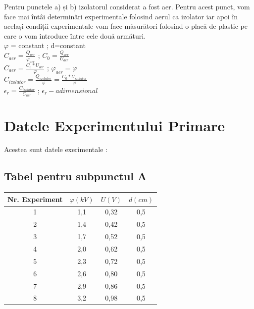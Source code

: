 \documentclass[12pt]{article}
\begin{document}
Pentru punctele a) și b) izolatorul considerat a fost aer. Pentru acest punct, vom face mai întâi determinări experimentale folosind aerul
ca izolator iar apoi în același condiții experimentale vom face măsurători folosind o placă de plastic pe care o vom introduce între cele două armături.\\

$\varphi$ = constant ; d=constant \\

$C_{aer}=\frac{Q_{aer}}{\varphi_{aer}}$  ;  $C_{0}=\frac{Q_{aer}}{U_{aer}}$\\

$C_{aer}=\frac{C_{0}*U_{aer}}{\varphi}$  ; $\varphi_{aer}=\varphi$\\

$C_{izolator}=\frac{Q_{izolator}}{\varphi}=\frac{C_{0}*U_{izolator}}{\varphi}$\\

$\epsilon_{r}=\frac{C_{izolator}}{C_{aer}}$  ;  $\epsilon_{r}-adimensional$\\



\section{Datele Experimentului Primare}
Acestea sunt datele exerimentale : 

\subsection{Tabel pentru subpunctul A}

\begin{table}[h!]
    \centering
    \begin{tabular}{|c|c|c|c|}
        \hline
        Nr. Experiment & $\varphi (kV)$ & $U (V)$  & $d (cm)$ \\
        \hline
        1 & 1,1 & 0,32 & 0,5 \\
        \hline
        2 & 1,4 & 0,42 & 0,5 \\
        \hline
        3 & 1,7 & 0,52 & 0,5 \\
        \hline
        4 & 2,0 & 0,62 & 0,5 \\
        \hline
        5 & 2,3 & 0,72 & 0,5 \\
        \hline
        6 & 2,6 & 0,80 & 0,5 \\
        \hline
        7 & 2,9 & 0,86 & 0,5 \\
        \hline
        8 & 3,2 & 0,98 & 0,5 \\
        \hline
    \end{tabular}
\end{table}
\end{document}
